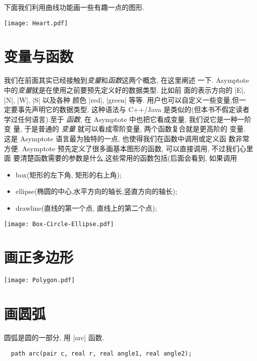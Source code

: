 \documentclass{ctexbook}
\begin{document}
下面我们利用曲线功能画一些有趣一点的图形. 
\begin{center}\texttt{[image: Heart.pdf]}\end{center}%


\section{变量与函数}
我们在前面其实已经接触到\emph{变量}和\emph{函数}这两个概念, 在这里阐述
一下. Asymptote 中的\emph{变量}就是在使用之前要预先定义好的数据类型. 比如前
面的表示方向的 |E|, |N|, |W|, |S| 以及各种
颜色 |red|, |green| 等等. 用户也可以自定义一些变量,但一
定要事先声明它的数据类型. 这种语法与 C++/Java 是类似的(但本书不假定读者
学过任何语言).至于 \emph{函数}, 在 Asymptote 中也把它看成变量, 我们说它是一种一阶变
量, 于是普通的 \emph{变量} 就可以看成零阶变量, 两个函数复合就是更高阶的
变量. 这是 Asymptote 语言最为独特的一点, 也使得我们在函数中调用或定义函
数非常方便. Asymptote 预先定义了很多画基本图形的函数, 可以直接调用, 不过我们心里面
要清楚函数需要的参数是什么.这些常用的函数包括(后面会看到, 如果调用
\begin{itemize}
\item {box(矩形的左下角, 矩形的右上角);}
\item {ellipse(椭圆的中心,水平方向的轴长,竖直方向的轴长);}
\item {drawline(直线的第一个点, 直线上的第二个点);}
\end{itemize}

\begin{center}\texttt{[image: Box-Circle-Ellipse.pdf]}\end{center}%


\section{画正多边形}
\begin{center}\texttt{[image: Polygon.pdf]}\end{center}%


\section{画圆弧}
圆弧是圆的一部分, 用 |arc| 函数.
\begin{lstlisting}
  path arc(pair c, real r, real angle1, real angle2);
\end{lstlisting}
\end{document}
